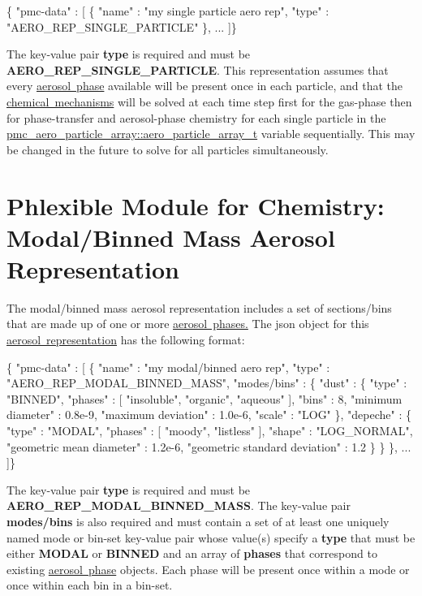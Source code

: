 \begin{DoxyCode}
\{ "pmc-data" : [
  \{
    "name" : "my single particle aero rep",
    "type" : "AERO\_REP\_SINGLE\_PARTICLE"
  \},
  ...
]\}
\end{DoxyCode}
 The key-\/value pair {\bfseries type} is required and must be {\bfseries A\+E\+R\+O\+\_\+\+R\+E\+P\+\_\+\+S\+I\+N\+G\+L\+E\+\_\+\+P\+A\+R\+T\+I\+C\+LE}. This representation assumes that every \mbox{\hyperlink{input_format_aero_phase}{aerosol phase}} available will be present once in each particle, and that the \mbox{\hyperlink{input_format_mechanism}{chemical mechanisms}} will be solved at each time step first for the gas-\/phase then for phase-\/transfer and aerosol-\/phase chemistry for each single particle in the {\ttfamily \mbox{\hyperlink{structpmc__aero__particle__array_1_1aero__particle__array__t}{pmc\+\_\+aero\+\_\+particle\+\_\+array\+::aero\+\_\+particle\+\_\+array\+\_\+t}}} variable sequentially. This may be changed in the future to solve for all particles simultaneously. \hypertarget{phlex_aero_rep_modal_binned_mass}{}\section{Phlexible Module for Chemistry\+: Modal/\+Binned Mass Aerosol Representation}\label{phlex_aero_rep_modal_binned_mass}
The modal/binned mass aerosol representation includes a set of sections/bins that are made up of one or more \mbox{\hyperlink{phlex_aero_phase}{aerosol phases.}} The {\ttfamily json} object for this \mbox{\hyperlink{phlex_aero_rep}{aerosol representation}} has the following format\+:


\begin{DoxyCode}
\{ "pmc-data" : [
  \{
    "name" : "my modal/binned aero rep",
    "type" : "AERO\_REP\_MODAL\_BINNED\_MASS",
    "modes/bins" : 
    \{
      "dust" : 
      \{
        "type" : "BINNED",
        "phases" : [ "insoluble", "organic", "aqueous" ],
        "bins" : 8,
        "minimum diameter" : 0.8e-9,
        "maximum deviation" : 1.0e-6,
        "scale" : "LOG"
      \},
      "depeche" :
      \{
        "type" : "MODAL",
        "phases" : [ "moody", "listless" ],
        "shape" : "LOG\_NORMAL",
        "geometric mean diameter" : 1.2e-6,
        "geometric standard deviation" : 1.2
      \}
    \}
  \},
  ...
]\}
\end{DoxyCode}
 The key-\/value pair {\bfseries type} is required and must be {\bfseries A\+E\+R\+O\+\_\+\+R\+E\+P\+\_\+\+M\+O\+D\+A\+L\+\_\+\+B\+I\+N\+N\+E\+D\+\_\+\+M\+A\+SS}. The key-\/value pair {\bfseries modes/bins} is also required and must contain a set of at least one uniquely named mode or bin-\/set key-\/value pair whose value(s) specify a {\bfseries type} that must be either {\bfseries M\+O\+D\+AL} or {\bfseries B\+I\+N\+N\+ED} and an array of {\bfseries phases} that correspond to existing \mbox{\hyperlink{phlex_aero_phase}{aerosol phase}} objects. Each phase will be present once within a mode or once within each bin in a bin-\/set.


